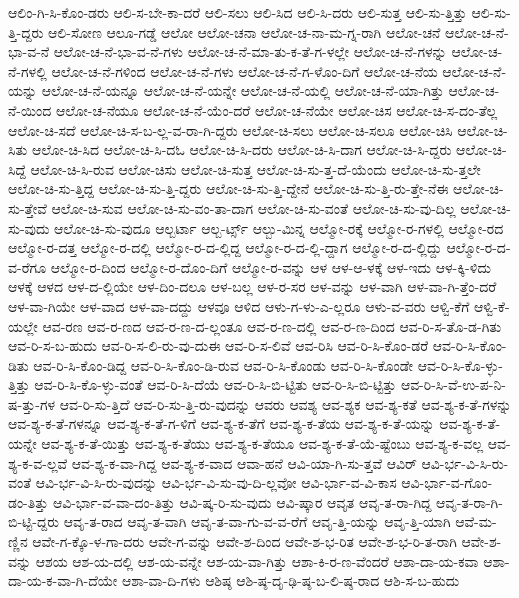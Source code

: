 {ಆಲಿಂ-ಗಿ-ಸಿ-ಕೊಂ-ಡರು
ಆಲಿ-ಸ-ಬೇ-ಕಾ-ದರೆ
ಆಲಿ-ಸಲು
ಆಲಿ-ಸಿದ
ಆಲಿ-ಸಿ-ದರು
ಆಲಿ-ಸುತ್ತ
ಆಲಿ-ಸು-ತ್ತಿತ್ತು
ಆಲಿ-ಸು-ತ್ತಿ-ದ್ದರು
ಆಲಿ-ಸೋಣ
ಆಲೂ-ಗಡ್ಡೆ
ಆಲೋ
ಆಲೋ-ಚನಾ
ಆಲೋ-ಚ-ನಾ-ಮ-ಗ್ನ-ರಾಗಿ
ಆಲೋ-ಚನೆ
ಆಲೋ-ಚ-ನೆ-ಭಾ-ವ-ನೆ
ಆಲೋ-ಚ-ನೆ-ಭಾ-ವ-ನೆ-ಗಳು
ಆಲೋ-ಚ-ನೆ-ಮಾ-ತು-ಕ-ತೆ-ಗ-ಳಲ್ಲೇ
ಆಲೋ-ಚ-ನೆ-ಗಳನ್ನು
ಆಲೋ-ಚ-ನೆ-ಗಳಲ್ಲಿ
ಆಲೋ-ಚ-ನೆ-ಗಳಿಂದ
ಆಲೋ-ಚ-ನೆ-ಗಳು
ಆಲೋ-ಚ-ನೆ-ಗ-ಳೊಂ-ದಿಗೆ
ಆಲೋ-ಚ-ನೆಯ
ಆಲೋ-ಚ-ನೆ-ಯನ್ನು
ಆಲೋ-ಚ-ನೆ-ಯನ್ನೂ
ಆಲೋ-ಚ-ನೆ-ಯನ್ನೇ
ಆಲೋ-ಚ-ನೆ-ಯಲ್ಲಿ
ಆಲೋ-ಚ-ನೆ-ಯಾ-ಗಿತ್ತು
ಆಲೋ-ಚ-ನೆ-ಯಿಂದ
ಆಲೋ-ಚ-ನೆಯೂ
ಆಲೋ-ಚ-ನೆ-ಯೆಂ-ದರೆ
ಆಲೋ-ಚ-ನೆಯೇ
ಆಲೋ-ಚಿಸ
ಆಲೋ-ಚಿ-ಸ-ದಂ-ತೆಲ್ಲ
ಆಲೋ-ಚಿ-ಸದೆ
ಆಲೋ-ಚಿ-ಸ-ಬ-ಲ್ಲ-ವ-ರಾ-ಗಿ-ದ್ದರು
ಆಲೋ-ಚಿ-ಸಲು
ಆಲೋ-ಚಿ-ಸಲೂ
ಆಲೋ-ಚಿಸಿ
ಆಲೋ-ಚಿ-ಸಿತು
ಆಲೋ-ಚಿ-ಸಿದ
ಆಲೋ-ಚಿ-ಸಿ-ದಓ
ಆಲೋ-ಚಿ-ಸಿ-ದರು
ಆಲೋ-ಚಿ-ಸಿ-ದಾಗ
ಆಲೋ-ಚಿ-ಸಿ-ದ್ದರು
ಆಲೋ-ಚಿ-ಸಿದ್ದೆ
ಆಲೋ-ಚಿ-ಸಿ-ರುವ
ಆಲೋ-ಚಿಸು
ಆಲೋ-ಚಿ-ಸುತ್ತ
ಆಲೋ-ಚಿ-ಸು-ತ್ತ-ದೆ-ಯೆಂದು
ಆಲೋ-ಚಿ-ಸು-ತ್ತಲೇ
ಆಲೋ-ಚಿ-ಸು-ತ್ತಿದ್ದ
ಆಲೋ-ಚಿ-ಸು-ತ್ತಿ-ದ್ದರು
ಆಲೋ-ಚಿ-ಸು-ತ್ತಿ-ದ್ದೇನೆ
ಆಲೋ-ಚಿ-ಸು-ತ್ತಿ-ರು-ತ್ತೇ-ನೆಈ
ಆಲೋ-ಚಿ-ಸು-ತ್ತೇವೆ
ಆಲೋ-ಚಿ-ಸುವ
ಆಲೋ-ಚಿ-ಸು-ವಂ-ತಾ-ದಾಗ
ಆಲೋ-ಚಿ-ಸು-ವಂತೆ
ಆಲೋ-ಚಿ-ಸು-ವು-ದಿಲ್ಲ
ಆಲೋ-ಚಿ-ಸು-ವುದು
ಆಲೋ-ಚಿ-ಸು-ವುದೂ
ಆಲ್ಬರ್ಟಾ
ಆಲ್ಬ-ರ್ಟ್ಸ್
ಆಲ್ಬು-ಮಿನ್ನ
ಆಲ್ಮೋ-ರಕ್ಕೆ
ಆಲ್ಮೋ-ರ-ಗಳಲ್ಲಿ
ಆಲ್ಮೋ-ರದ
ಆಲ್ಮೋ-ರ-ದತ್ತ
ಆಲ್ಮೋ-ರ-ದಲ್ಲಿ
ಆಲ್ಮೋ-ರ-ದ-ಲ್ಲಿದ್ದ
ಆಲ್ಮೋ-ರ-ದ-ಲ್ಲಿ-ದ್ದಾಗ
ಆಲ್ಮೋ-ರ-ದ-ಲ್ಲಿದ್ದು
ಆಲ್ಮೋ-ರ-ದ-ವ-ರೆಗೂ
ಆಲ್ಮೋ-ರ-ದಿಂದ
ಆಲ್ಮೋ-ರ-ದೊಂ-ದಿಗೆ
ಆಲ್ಮೋ-ರ-ವನ್ನು
ಆಳ
ಆಳ-ಆ-ಳಕ್ಕೆ
ಆಳ-ಇದು
ಆಳ-ಕ್ಕಿ-ಳಿದು
ಆಳಕ್ಕೆ
ಆಳದ
ಆಳ-ದ-ಲ್ಲಿಯೇ
ಆಳ-ದಿಂ-ದಲೂ
ಆಳ-ಬಲ್ಲ
ಆಳ-ರ-ಸರ
ಆಳ-ವನ್ನು
ಆಳ-ವಾಗಿ
ಆಳ-ವಾ-ಗಿ-ತ್ತೆಂ-ದರೆ
ಆಳ-ವಾ-ಗಿಯೇ
ಆಳ-ವಾದ
ಆಳ-ವಾ-ದದ್ದು
ಆಳವೂ
ಆಳಿದ
ಆಳು-ಗ-ಳು-ಎ-ಲ್ಲರೂ
ಆಳು-ವ-ವರು
ಆಳ್ವಿ-ಕೆಗೆ
ಆಳ್ವಿ-ಕೆ-ಯಲ್ಲೇ
ಆವ-ರಣ
ಆವ-ರ-ಣದ
ಆವ-ರ-ಣ-ದ-ಲ್ಲಂತೂ
ಆವ-ರ-ಣ-ದಲ್ಲಿ
ಆವ-ರ-ಣ-ದಿಂದ
ಆವ-ರಿ-ಸ-ತೊ-ಡ-ಗಿತು
ಆವ-ರಿ-ಸ-ಬ-ಹುದು
ಆವ-ರಿ-ಸ-ಲಿ-ರು-ವು-ದುಈ
ಆವ-ರಿ-ಸ-ಲಿವೆ
ಆವ-ರಿಸಿ
ಆವ-ರಿ-ಸಿ-ಕೊಂ-ಡರೆ
ಆವ-ರಿ-ಸಿ-ಕೊಂ-ಡಿತು
ಆವ-ರಿ-ಸಿ-ಕೊಂ-ಡಿದ್ದ
ಆವ-ರಿ-ಸಿ-ಕೊಂ-ಡಿ-ರುವ
ಆವ-ರಿ-ಸಿ-ಕೊಂಡು
ಆವ-ರಿ-ಸಿ-ಕೊಂಡೇ
ಆವ-ರಿ-ಸಿ-ಕೊ-ಳ್ಳು-ತ್ತಿತ್ತು
ಆವ-ರಿ-ಸಿ-ಕೊ-ಳ್ಳು-ವಂತೆ
ಆವ-ರಿ-ಸಿ-ದೆಯೆ
ಆವ-ರಿ-ಸಿ-ಬಿ-ಟ್ಟಿತು
ಆವ-ರಿ-ಸಿ-ಬಿ-ಟ್ಟಿತ್ತು
ಆವ-ರಿ-ಸಿ-ವೆ-ಉ-ಪ-ನಿ-ಷ-ತ್ತು-ಗಳ
ಆವ-ರಿ-ಸು-ತ್ತಿದೆ
ಆವ-ರಿ-ಸು-ತ್ತಿ-ರು-ವುದನ್ನು
ಆವರು
ಆವಶ್ಯ
ಆವ-ಶ್ಯಕ
ಆವ-ಶ್ಯ-ಕತೆ
ಆವ-ಶ್ಯ-ಕ-ತೆ-ಗಳನ್ನು
ಆವ-ಶ್ಯ-ಕ-ತೆ-ಗಳನ್ನೂ
ಆವ-ಶ್ಯ-ಕ-ತೆ-ಗ-ಳಿಗೆ
ಆವ-ಶ್ಯ-ಕ-ತೆಗೆ
ಆವ-ಶ್ಯ-ಕ-ತೆಯ
ಆವ-ಶ್ಯ-ಕ-ತೆ-ಯನ್ನು
ಆವ-ಶ್ಯ-ಕ-ತೆ-ಯನ್ನೇ
ಆವ-ಶ್ಯ-ಕ-ತೆ-ಯಿತ್ತು
ಆವ-ಶ್ಯ-ಕ-ತೆಯು
ಆವ-ಶ್ಯ-ಕ-ತೆಯೂ
ಆವ-ಶ್ಯ-ಕ-ತೆ-ಯೆ-ಷ್ಟೆಂಬು
ಆವ-ಶ್ಯ-ಕ-ವಲ್ಲ
ಆವ-ಶ್ಯ-ಕ-ವ-ಲ್ಲವೆ
ಆವ-ಶ್ಯ-ಕ-ವಾ-ಗಿದ್ದ
ಆವ-ಶ್ಯ-ಕ-ವಾದ
ಆವಾ-ಹನೆ
ಆವಿ-ಯಾ-ಗಿ-ಸು-ತ್ತವೆ
ಆವಿರ್
ಆವಿ-ರ್ಭ-ವಿ-ಸಿ-ರು-ವಂತೆ
ಆವಿ-ರ್ಭ-ವಿ-ಸಿ-ರು-ವುದನ್ನು
ಆವಿ-ರ್ಭ-ವಿ-ಸು-ವು-ದಿ-ಲ್ಲವೋ
ಆವಿ-ರ್ಭಾ-ವ-ವಿ-ಕಾಸ
ಆವಿ-ರ್ಭಾ-ವ-ಗೊಂ-ಡಂ-ತಿತ್ತು
ಆವಿ-ರ್ಭಾ-ವ-ವಾ-ದಂ-ತಿತ್ತು
ಆವಿ-ಷ್ಕ-ರಿ-ಸು-ವುದು
ಆವಿ-ಷ್ಕಾರ
ಆವೃತ
ಆವೃ-ತ-ರಾ-ಗಿದ್ದ
ಆವೃ-ತ-ರಾ-ಗಿ-ಬಿ-ಟ್ಟಿ-ದ್ದರು
ಆವೃ-ತ-ರಾದ
ಆವೃ-ತ-ವಾಗಿ
ಆವೃ-ತ-ವಾ-ಗು-ವ-ವ-ರೆಗೆ
ಆವೃ-ತ್ತಿ-ಯನ್ನು
ಆವೃ-ತ್ತಿ-ಯಾಗಿ
ಆವೆ-ಮ-ಣ್ಣಿನ
ಆವೇ-ಗ-ಕ್ಕೊ-ಳ-ಗಾ-ದರು
ಆವೇ-ಗ-ವನ್ನು
ಆವೇ-ಶ-ದಿಂದ
ಆವೇ-ಶ-ಭ-ರಿತ
ಆವೇ-ಶ-ಭ-ರಿ-ತ-ರಾಗಿ
ಆವೇ-ಶ-ವನ್ನು
ಆಶಯ
ಆಶ-ಯ-ದಲ್ಲಿ
ಆಶ-ಯ-ವನ್ನೇ
ಆಶ-ಯ-ವಾ-ಗಿತ್ತು
ಆಶಾ-ಕಿ-ರ-ಣ-ವೆಂದರೆ
ಆಶಾ-ದಾ-ಯ-ಕವಾ
ಆಶಾ-ದಾ-ಯ-ಕ-ವಾ-ಗಿ-ದೆಯೇ
ಆಶಾ-ವಾ-ದಿ-ಗಳು
ಆಶಿಷ್ಠ
ಆಶಿ-ಷ್ಠ-ದೃ-ಢಿ-ಷ್ಠ-ಬ-ಲಿ-ಷ್ಠ-ರಾದ
ಆಶಿ-ಸ-ಬ-ಹುದು
}
